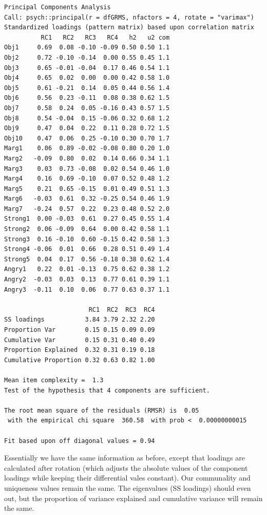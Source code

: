 \documentclass[
  english,
]{book}
\begin{document}
\begin{verbatim}
Principal Components Analysis
Call: psych::principal(r = dfGRMS, nfactors = 4, rotate = "varimax")
Standardized loadings (pattern matrix) based upon correlation matrix
          RC1   RC2   RC3   RC4   h2   u2 com
Obj1     0.69  0.08 -0.10 -0.09 0.50 0.50 1.1
Obj2     0.72 -0.10 -0.14  0.00 0.55 0.45 1.1
Obj3     0.65 -0.01 -0.04  0.17 0.46 0.54 1.1
Obj4     0.65  0.02  0.00  0.00 0.42 0.58 1.0
Obj5     0.61 -0.21  0.14  0.05 0.44 0.56 1.4
Obj6     0.56  0.23 -0.11  0.08 0.38 0.62 1.5
Obj7     0.58  0.24  0.05 -0.16 0.43 0.57 1.5
Obj8     0.54 -0.04  0.15 -0.06 0.32 0.68 1.2
Obj9     0.47  0.04  0.22  0.11 0.28 0.72 1.5
Obj10    0.47  0.06  0.25 -0.10 0.30 0.70 1.7
Marg1    0.06  0.89 -0.02 -0.08 0.80 0.20 1.0
Marg2   -0.09  0.80  0.02  0.14 0.66 0.34 1.1
Marg3    0.03  0.73 -0.08  0.02 0.54 0.46 1.0
Marg4    0.16  0.69 -0.10  0.07 0.52 0.48 1.2
Marg5    0.21  0.65 -0.15  0.01 0.49 0.51 1.3
Marg6   -0.03  0.61  0.32 -0.25 0.54 0.46 1.9
Marg7   -0.24  0.57  0.22  0.23 0.48 0.52 2.0
Strong1  0.00 -0.03  0.61  0.27 0.45 0.55 1.4
Strong2  0.06 -0.09  0.64  0.00 0.42 0.58 1.1
Strong3  0.16 -0.10  0.60 -0.15 0.42 0.58 1.3
Strong4 -0.06  0.01  0.66  0.28 0.51 0.49 1.4
Strong5  0.04  0.17  0.56 -0.18 0.38 0.62 1.4
Angry1   0.22  0.01 -0.13  0.75 0.62 0.38 1.2
Angry2  -0.03  0.03  0.13  0.77 0.61 0.39 1.1
Angry3  -0.11  0.10  0.06  0.77 0.63 0.37 1.1

                       RC1  RC2  RC3  RC4
SS loadings           3.84 3.79 2.32 2.20
Proportion Var        0.15 0.15 0.09 0.09
Cumulative Var        0.15 0.31 0.40 0.49
Proportion Explained  0.32 0.31 0.19 0.18
Cumulative Proportion 0.32 0.63 0.82 1.00

Mean item complexity =  1.3
Test of the hypothesis that 4 components are sufficient.

The root mean square of the residuals (RMSR) is  0.05 
 with the empirical chi square  360.58  with prob <  0.00000000015 

Fit based upon off diagonal values = 0.94
\end{verbatim}

Essentially we have the same information as before, except that loadings are calculated after rotation (which adjusts the absolute values of the component loadings while keeping their differential vales constant). Our communality and uniqueness values remain the same. The eigenvalues (SS loadings) should even out, but the proportion of variance explained and cumulative variance will remain the same.
\end{document}
